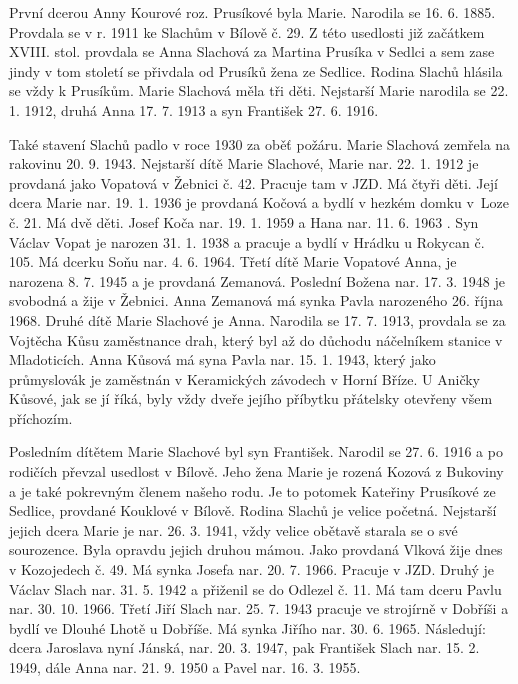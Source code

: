 \documentclass[../dejiny-rodu-prusiku.tex]{subfiles}
\begin{document}
První dcerou Anny Kourové roz. Prusíkové byla Marie. Narodila se 16. 6. 1885. Provdala se v r. 1911 ke Slachům v Bílově č. 29. Z této usedlosti již začátkem XVIII. stol. provdala se Anna Slachová za Martina Prusíka v Sedlci a sem zase jindy v tom století se přivdala od Prusíků žena ze Sedlice. Rodina Slachů hlásila se vždy k Prusíkům. Marie Slachová měla tři děti. Nejstarší Marie narodila se 22. 1. 1912, druhá Anna 17. 7. 1913 a syn František 27. 6. 1916.

Také stavení Slachů padlo v roce 1930 za oběť požáru. Marie Slachová zemřela na rakovinu 20. 9. 1943. Nejstarší dítě Marie Slachové, Marie nar. 22. 1. 1912 je provdaná jako Vopatová v Žebnici č. 42. Pracuje tam v JZD. Má čtyři děti. Její dcera Marie nar. 19. 1. 1936 je provdaná Kočová a bydlí v hezkém domku v Loze č. 21. Má dvě děti. Josef Koča nar. 19. 1. 1959 a Hana nar. 11. 6. 1963 . Syn Václav Vopat je narozen 31. 1. 1938 a pracuje a bydlí v Hrádku u Rokycan č. 105. Má dcerku Soňu nar. 4. 6. 1964. Třetí dítě Marie Vopatové Anna, je narozena 8. 7. 1945 a je provdaná Zemanová. Poslední Božena nar. 17. 3. 1948 je svobodná a žije v Žebnici. Anna Zemanová má synka Pavla narozeného 26. října 1968. Druhé dítě Marie Slachové je Anna. Narodila se 17. 7. 1913, provdala se za Vojtěcha Kůsu zaměstnance drah, který byl až do důchodu náčelníkem stanice v Mladoticích. Anna Kůsová má syna Pavla nar. 15. 1. 1943, který jako průmyslovák je zaměstnán v Keramických závodech v Horní Bříze. U Aničky Kůsové, jak se jí říká, byly vždy dveře jejího příbytku přátelsky otevřeny všem příchozím.

Posledním dítětem Marie Slachové byl syn František. Narodil se 27. 6. 1916 a po rodičích převzal usedlost v Bílově. Jeho žena Marie je rozená Kozová z Bukoviny a je také pokrevným členem našeho rodu. Je to potomek Ka­teřiny Prusíkové ze Sedlice, provdané Kouklové v Bílo­vě. Rodina Slachů je velice početná. Nejstarší jejich dcera Marie je nar. 26. 3. 1941, vždy velice obětavě starala se o své sourozence. Byla opravdu jejich druhou mámou. Jako provdaná Vlková žije dnes v Kozojedech č. 49. Má synka Josefa nar. 20. 7. 1966. Pracuje v JZD. Druhý je Václav Slach nar. 31. 5. 1942 a přiženil se do Odlezel č. 11. Má tam dceru Pavlu nar. 30. 10. 1966. Třetí Jiří Slach nar. 25. 7. 1943 pracuje ve strojírně v Dobříši a bydlí ve Dlouhé Lhotě u Dobříše. Má synka Jiřího nar. 30. 6. 1965. Následují: dcera Jaroslava nyní Jánská, nar. 20. 3. 1947, pak František Slach nar. 15. 2. 1949, dále Anna nar. 21. 9. 1950 a Pavel nar. 16. 3. 1955.
\end{document}

